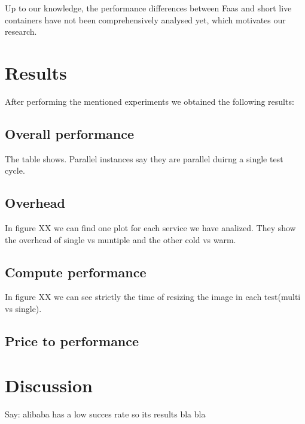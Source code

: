 \documentclass[11pt]{article}
\begin{document}
Up to our knowledge, the performance differences between Faas and short live containers have not been comprehensively analysed yet, which motivates our research.

\section{Results}
After performing the mentioned experiments we obtained the following results:

\subsection{Overall performance}

The table shows. Parallel instances say they are parallel duirng a single test cycle. 



\subsection{Overhead}

In figure XX we can find one plot for each service we have analized. They show the overhead of single vs muntiple and the other cold vs warm. 



\subsection{Compute performance}

In figure XX we can see strictly the time of resizing the image in each test(multi vs single). 


\subsection{Price to performance}



\section{Discussion}
Say: alibaba has a low succes rate so its results bla bla
\end{document}
